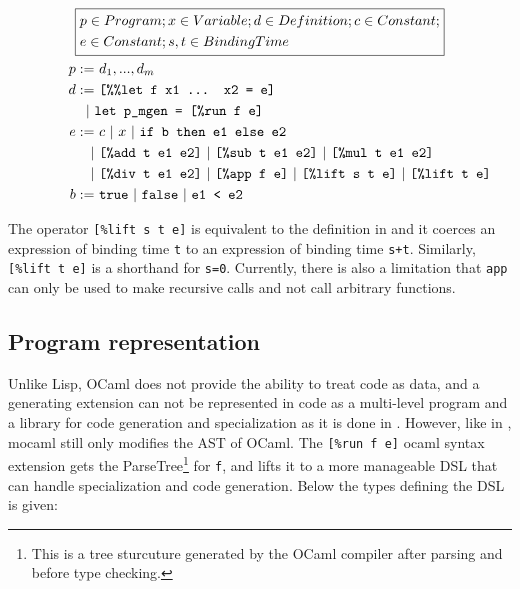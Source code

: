 \begin{gather*}  
  \boxed{    
    \begin{aligned}
      &p\in Program; x\in Variable; d\in Definition; c\in Constant;\\
      &e \in Constant; s,t \in BindingTime
    \end{aligned}
  }\\
  \hspace{1cm}
  \begin{align*}
    p :=&~d_1,...,d_m\\
    d :=&~\text{\texttt{[\%\%let f x1 ... x2 = e]}}\\
    |~& \text{\texttt{let p\_mgen = [\%run f e]}}\\
    e :=&~c ~|~x ~|~\text{\texttt{if b then e1 else e2}}\\
    |&~\text{\texttt{[\%add t e1 e2]}}
       ~|~\text{\texttt{[\%sub t e1 e2]}}
       ~|~\text{\texttt{[\%mul t e1 e2]}}\\
    |&~\text{\texttt{[\%div t e1 e2]}}
       ~|~\text{\texttt{[\%app f e]}}
       ~|~\text{\texttt{[\%lift s t e]}}
       ~|~\text{\texttt{[\%lift t e]}}\\
    b :=&~\mathtt{true} ~|~\mathtt{false} ~|~\text{\texttt{e1 < e2}}
  \end{align*}
\end{gather*}

The operator \texttt{[\%lift s t e]} is equivalent to the definition in \cite{multilevel} and it coerces an expression of binding time \texttt{t} to an expression of binding time \texttt{s+t}. Similarly, \texttt{[\%lift t e]} is a shorthand for \texttt{s=0}. Currently, there is also a limitation that \texttt{app} can only be used to make recursive calls and not call arbitrary functions.

\subsection{Program representation}

Unlike Lisp, OCaml does not provide the ability to treat code as data, and a generating extension can not be represented in code as a multi-level program and a library for code generation and specialization as it is done in \cite{multilevel}. However, like in \cite{multilevel}, mocaml still only modifies the AST of OCaml.
The \texttt{[\%run f e]} ocaml syntax extension gets the ParseTree\footnote{This is a tree sturcuture generated by the OCaml compiler after parsing and before type checking.} for \texttt{f}, and lifts it to a more manageable DSL that can handle specialization and code generation. Below the types defining the DSL is given:

